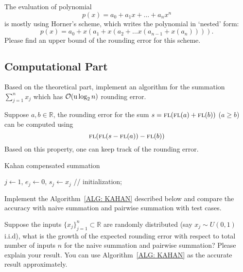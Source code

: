 \begin{problem}
\label{Prb: 1-Theo-3}
The evaluation of polynomial 
    $$p(x) = a_0 + a_1 x + \dots + a_n x^n$$
is mostly using Horner's scheme, which writes the polynomial in `nested' form:
\begin{equation}
p(x) = a_0 + x (a_1 + x(a_2 + \dots x(a_{n-1} + x(a_n)))).
\end{equation}                                
Please find an upper bound of the rounding error for this scheme.         
\end{problem}

\subsection{Computational Part}

\begin{problem}
    Based on the theoretical part, implement an algorithm for the summation $\sum_{j=1}^n x_j$ which has $\mathcal O(\textup{u}\log_2 n)$ rounding error.
\end{problem}

\begin{problem} 
\label{Prb: 1-Kahan-Sum}
Suppose $a, b\in\mathbb{R}$, the rounding error for the sum $s = {\textsc{fl}}({\textsc{fl}}(a)+{\textsc{fl}}(b))$ ($a\ge b$) can be computed using 
    $${\textsc{fl}}({\textsc{fl}}(s - {\textsc{fl}}(a))-{\textsc{fl}}(b))$$
    Based on this property, one can keep track of the rounding error. 
\begin{algorithm}[!htb]
    \SetAlgoLined
    \caption{Kahan compensated summation}\label{alg:1}
    $j\gets 1$, $e_j \gets 0$, $s_j \gets x_j$ //    initialization; 
    \\
    \label{ALG: KAHAN}
\end{algorithm}
    Implement the Algorithm~\ref{ALG: KAHAN} described below and compare the accuracy with naive summation and pairwise summation with test cases.
\end{problem}


\begin{problem}
    Suppose the inputs $\{x_j\}_{j=1}^n\subset \mathbb{R}$ are randomly distributed (say $x_j\sim U(0,1)$ i.i.d), what is the growth of the expected rounding error with respect to total number of inputs $n$ for the naive summation and pairwise summation? Please explain your result. You can use Algorithm~\ref{ALG: KAHAN} as the accurate result approximately. 
\end{problem}
\newpage
\nocite{higham1993accuracy,higham2019new,muller2006elementary}


